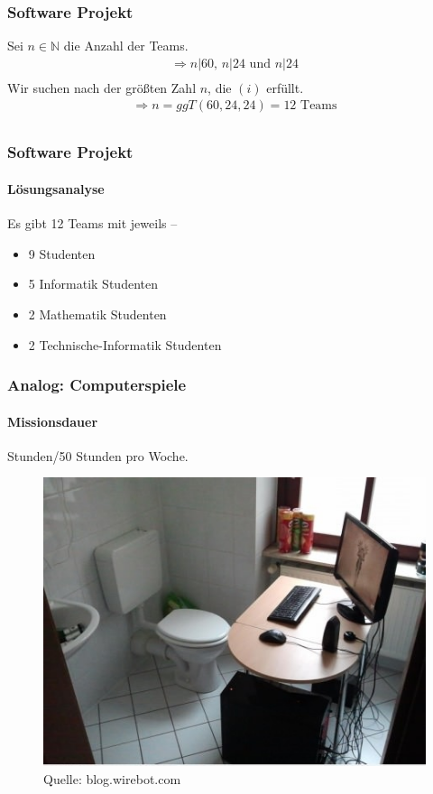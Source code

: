 \documentclass[•]{beamer}
\begin{document}
\begin{frame}
	\frametitle{Software Projekt}
	Sei $n \in \mathbb{N}$ die Anzahl der Teams.
	\pause 
	\begin{align*}
	\Rightarrow n|60 \text{, } n|24 \text{ und } n|24 \tag{i}\\
	\end{align*}
	\pause 
	Wir suchen nach der gr\"o{\ss}ten Zahl $n$, die $(i)$ erf\"ullt.
	\pause 
	\begin{align*}
	\Rightarrow n = \textit{ggT}(60,24,24) = 12 \text{ Teams}\\
	\end{align*}
	
\end{frame}

\begin{frame}
	\frametitle{Software Projekt}
	\framesubtitle{L\"osungsanalyse}
	Es gibt 12 Teams mit jeweils  --\\
	\begin{itemize}
	\item 9 Studenten
	\pause 
	\item 5 Informatik Studenten
	\pause 
	\item 2 Mathematik Studenten
	\pause 
	\item 2 Technische-Informatik Studenten
	\end{itemize}
\end{frame}

\begin{frame}
\frametitle{Analog: Computerspiele}
\framesubtitle{Missionsdauer}
\vspace*{10pt}
 Stunden/50 Stunden pro Woche.\\
\pause 
 \begin{figure}
	\centering
	\includegraphics[scale=0.6]{gamers}
	\caption*{\scriptsize{Quelle: blog.wirebot.com}}
	\end{figure}
\end{frame}
\end{document}
